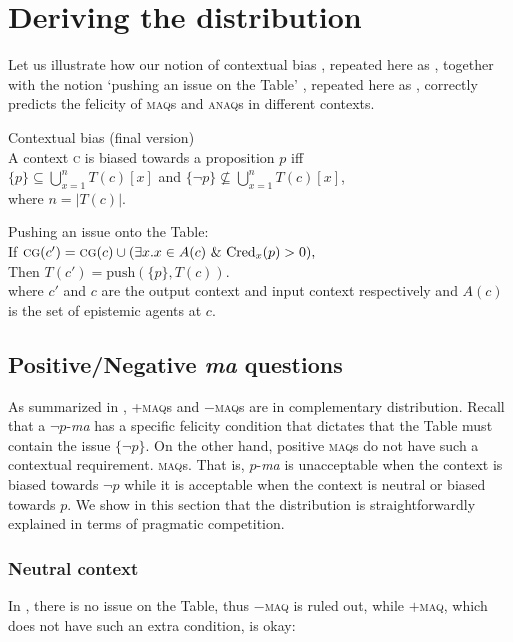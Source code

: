 \documentclass[output=paper,colorlinks,citecolor=brown]{langscibook}
\begin{document}
\section{Deriving the distribution}

 Let us illustrate how our notion of contextual bias , repeated here as , together with the notion `pushing an issue on the Table' , repeated here as , correctly predicts the felicity of \textsc{maq}s and \textsc{anaq}s in different contexts.
 
 \ea\label{cbtable2} Contextual bias (final version)\\
 A context \textsc{c} is biased towards a proposition $p$ iff\\
 $\{p\}\subseteq\bigcup_{x=1}^n{T}({c})[x]$ and $\{\neg p\}\not\subseteq\bigcup_{x=1}^n{T}({c})[x]$,\\
 where $n=|T({c})|$.
\z
 
  \ea \label{tablecg2} Pushing an issue onto the Table:\\
      If $\textsc{cg}({c}') =\textsc{cg}({c}) \cup (\exists x.x\in A({c})\ \&\ \mathrm{Cred}_{x}(p) > 0),$\\ Then
 ${T}({c}') = \mathrm{push}(\{p\}, {T}({c}))$.\\ where ${c}'$ and ${c}$ are  the output context and  input context respectively and $A({c})$ is the set of epistemic agents at ${c}$.
\z
 
\subsection{Positive/Negative \textit{ma} questions}\label{subsec:pnmaq}
As summarized in , +\textsc{maq}s and $-$\textsc{maq}s are in complementary distribution.
  Recall that a $\neg p$-\emph{ma} has a  specific felicity condition  that dictates that the Table must contain the issue $\{\neg p\}$.  On the other hand, positive \textsc{maq}s do not have such a contextual requirement.   \textsc{maq}s.  That is, $p$-\emph{ma} is unacceptable when the context is biased towards $\neg p$ while it is acceptable when the context is neutral or biased towards $p$.  We show in this section that the distribution is straightforwardly explained in terms of pragmatic competition.
 
 
 \subsubsection{Neutral context}
 In , there is no issue on the Table, thus $-$\textsc{maq} is ruled out, while $+$\textsc{maq}, which does not have such an extra condition, is okay:
 
\end{document}

